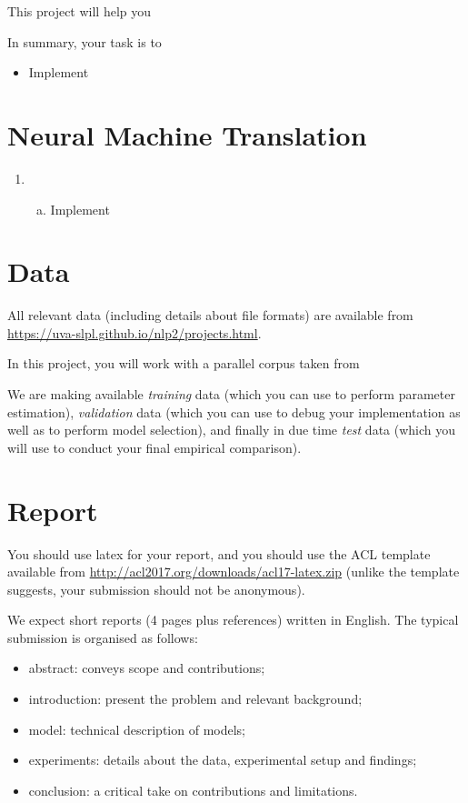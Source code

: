 
This project will help you 

In summary, your task is to

\begin{itemize}
	\item Implement 
\end{itemize}

\section{Neural Machine Translation}

\begin{enumerate}
	\item 
	\begin{enumerate}[a)]
		\item Implement 
	\end{enumerate}
\end{enumerate}




\section{Data}

All relevant data (including details about file formats) are available from \url{https://uva-slpl.github.io/nlp2/projects.html}.

In this project, you will work with a parallel corpus taken from 

We are making available \emph{training} data (which you can use to perform parameter estimation), \emph{validation} data (which you can use to debug your implementation as well as to perform model selection), and finally in due time \emph{test} data (which you will use to conduct your final empirical comparison).



\section{Report}

You should use latex for your report, and you should use the ACL template available from \url{http://acl2017.org/downloads/acl17-latex.zip} (unlike the template suggests, your submission should not be anonymous). 

We expect short reports (4 pages plus references) written in English. The typical submission is organised as follows: 
\begin{itemize}
	\item abstract: conveys scope and contributions;
	\item introduction: present the problem and relevant background;
	\item model: technical description of models;
	\item experiments: details about the data, experimental setup and findings;
	\item conclusion: a critical take on contributions and limitations.
\end{itemize}


